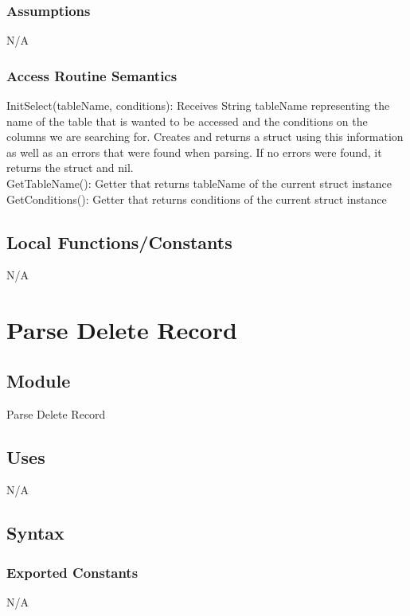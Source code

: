 \documentclass[12pt]{article}
\begin{document}
\subsubsection {Assumptions}
N/A

\subsubsection {Access Routine Semantics}
\noindent InitSelect(tableName, conditions): Receives String tableName representing the name of the table that is wanted to be accessed and the conditions on the columns we are searching for. Creates and returns a struct using this information as well as an errors that were found when parsing. If no errors were found, it returns the struct and nil. \\

\noindent GetTableName(): Getter that returns tableName of the current struct instance \\

\noindent GetConditions(): Getter that returns conditions of the current struct instance \\

\subsection{Local Functions/Constants}
N/A
\medskip


\newpage

\section{Parse Delete Record}

\subsection{Module}
Parse Delete Record

\subsection {Uses}
N/A

\subsection {Syntax}

\subsubsection {Exported Constants}
N/A
\end{document}
